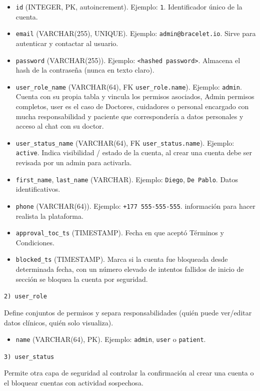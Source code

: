 \documentclass[12pt, a4paper]{article}
\begin{document}
\begin{itemize}
	\item \texttt{id} (INTEGER, PK, autoincrement). Ejemplo: \texttt{1}. Identificador único de la cuenta.
	\item \texttt{email} (VARCHAR(255), UNIQUE). Ejemplo: \texttt{admin@bracelet.io}. Sirve para autenticar y contactar al usuario.
	\item \texttt{password} (VARCHAR(255)). Ejemplo: \texttt{\textless hashed password\textgreater}. Almacena el hash de la contraseña (nunca en texto claro).
	\item \texttt{user\_role\_name} (VARCHAR(64), FK \texttt{user\_role.name}). Ejemplo: \texttt{admin}. Cuenta con su propia tabla y vincula los permisos asociados, Admin permisos completos, user es el caso de Doctores, cuidadores o personal encargado con mucha responsabilidad y paciente que correspondería a datos personales y acceso al chat con su doctor.
	\item \texttt{user\_status\_name} (VARCHAR(64), FK \texttt{user\_status.name}). Ejemplo: \texttt{active}. Indica visibilidad / estado de la cuenta, al crear una cuenta debe ser revisada por un admin para activarla.
	\item \texttt{first\_name}, \texttt{last\_name} (VARCHAR). Ejemplo: \texttt{Diego}, \texttt{De Pablo}. Datos identificativos.
	\item \texttt{phone} (VARCHAR(64)). Ejemplo: \texttt{+177 555-555-555}. información para hacer realista la plataforma.
	\item \texttt{approval\_toc\_ts} (TIMESTAMP). Fecha en que aceptó Términos y Condiciones.
	\item \texttt{blocked\_ts} (TIMESTAMP). Marca si la cuenta fue bloqueada desde determinada fecha, con un número elevado de intentos fallidos de inicio de sección se bloquea la cuenta por seguridad.
\end{itemize}


\texttt{2) user\_role}

Define conjuntos de permisos y separa responsabilidades (quién puede ver/editar datos clínicos, quién solo visualiza).

\begin{itemize}
	\item \texttt{name} (VARCHAR(64), PK). Ejemplo: \texttt{admin}, \texttt{user} o \texttt{patient}.
\end{itemize}


\texttt{3) user\_status}

Permite otra capa de seguridad al controlar la confirmación al crear una cuenta o el bloquear cuentas con actividad sospechosa.
\end{document}
